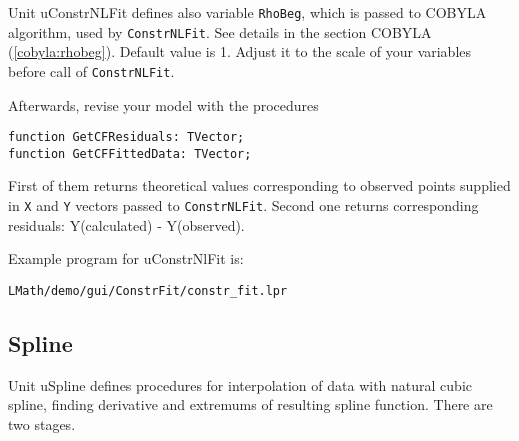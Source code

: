 \documentclass[12pt,a4paper,oneside]{article}
\newcommand{\code}[1]{\texttt{#1}}
\begin{document}
Unit uConstrNLFit defines also variable \code{RhoBeg}, which is passed to COBYLA algorithm, used by \code{ConstrNLFit}. See details in the section COBYLA (\ref{cobyla:rhobeg}). Default value is 1. Adjust it to the scale of your variables before call of \code{ConstrNLFit}.

Afterwards, revise your model with the procedures 
\begin{verbatim}
function GetCFResiduals: TVector;
function GetCFFittedData: TVector;
\end{verbatim}
First of them returns theoretical values corresponding to observed points supplied in \code{X} and \code{Y} vectors passed to \code{ConstrNLFit}. Second one returns corresponding residuals: Y(calculated) - Y(observed).
 
Example program for uConstrNlFit is:
\begin{verbatim}
LMath/demo/gui/ConstrFit/constr_fit.lpr 
\end{verbatim}
\pagebreak
\subsection{Spline}
Unit uSpline defines procedures for interpolation of data with natural cubic spline, finding derivative and extremums of resulting spline function. There are two stages.
\end{document}
